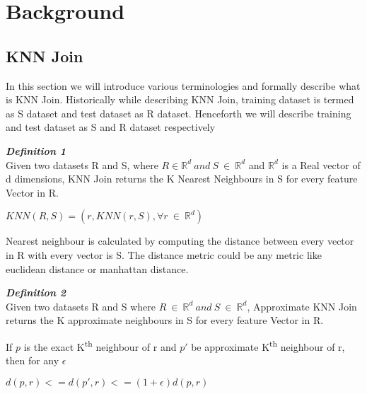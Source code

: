 \chapter{Background} \label{chap:Background}

\section{KNN Join}
In this section we will introduce various terminologies and formally
describe what is KNN Join. Historically while describing KNN Join, training dataset is termed as
S dataset and test dataset as R dataset. Henceforth we will describe
training and test dataset as S and R dataset respectively

\textbf{\emph{Definition 1}} \\
Given two datasets R and S, where $R \in \mathbb{R}^d\ and\ S\ \in\
\mathbb{R}^d$ and $\mathbb{R}^d$ is a Real vector of d dimensions, KNN Join returns the K
Nearest Neighbours in S for every feature Vector in R.

\medskip

\begin{center}
     $KNN(R,S) = {(r, KNN(r,S), \forall r\ \in\ \mathbb{R}^d)}$
\end{center}

Nearest neighbour is calculated by computing the distance between every vector
in R with every vector is S. The distance metric could be any metric
like euclidean distance or manhattan distance.

\medskip

\textbf{\emph{Definition 2}} \\
 Given two datasets R and S where $R\ \in\
\mathbb{R}^d\ and\ S\ \in\ \mathbb{R}^d$, Approximate KNN Join returns the K
approximate neighbours in S for every feature Vector in R.

\medskip

If $p$ is the exact K\textsuperscript{th} neighbour of r and $p'$ be approximate
K\textsuperscript{th} neighbour of r, then for any $\epsilon$

\bigskip

\begin{center}
$d(p,r) <= d(p',r) <= (1+\epsilon) d(p,r)$
\end{center}

\bigskip

